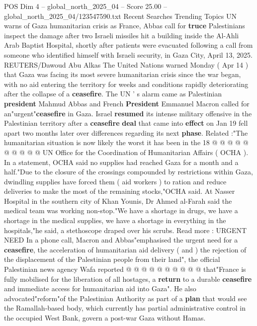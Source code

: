 \begin{textsample}{POS Dim 4 – global\_north\_2025\_04 – Score 25.00 – global\_north\_2025\_04/123547590.txt}  \label{ex:f4_pos_213}
Recent Searches Trending Topics UN warns of Gaza humanitarian crisis as France, Abbas call for \textbf{truce} Palestinians inspect the damage after two Israeli missiles hit a building inside the Al-Ahli Arab Baptist Hospital, shortly after patients were evacuated following a call from someone who identified himself with Israeli security, in Gaza City, April 13, 2025.
REUTERS/Dawoud Abu Alkas The United Nations warned Monday ( Apr 14 ) that Gaza was facing its most severe humanitarian crisis since the war began, with no aid entering the territory for weeks and conditions rapidly deteriorating after the collapse of a \textbf{ceasefire}.
The UN ' s alarm came as Palestinian \textbf{president} Mahmud Abbas and French \textbf{President} Emmanuel Macron called for an"urgent"\textbf{ceasefire} in Gaza.
Israel \textbf{resumed} its intense military offensive in the Palestinian territory after a \textbf{ceasefire} \textbf{deal} that came into \textbf{effect} on Jan 19 fell apart two months later over differences regarding its next \textbf{phase}.
Related :"The humanitarian situation is now likely the worst it has been in the 18 @ @ @ @ @ @ @ @ @ @ UN Office for the Coordination of Humanitarian Affairs ( OCHA ).
In a statement, OCHA said no supplies had reached Gaza for a month and a half."Due to the closure of the crossings compounded by restrictions within Gaza, dwindling supplies have forced them ( aid workers ) to ration and reduce deliveries to make the most of the remaining stocks,"OCHA said.
At Nasser Hospital in the southern city of Khan Younis, Dr Ahmed al-Farah said the medical team was working non-stop."We have a shortage in drugs, we have a shortage in the medical supplies, we have a shortage in everything in the hospitals,"he said, a stethoscope draped over his scrubs.
Read more : URGENT NEED In a phone call, Macron and Abbas"emphasised the urgent need for a \textbf{ceasefire}, the acceleration of humanitarian aid delivery ( and ) the rejection of the displacement of the Palestinian people from their land", the official Palestinian news agency Wafa reported @ @ @ @ @ @ @ @ @ @ that"France is fully mobilised for the liberation of all hostages, a \textbf{return} to a durable \textbf{ceasefire} and immediate access for humanitarian aid into Gaza".
He also advocated"reform"of the Palestinian Authority as part of a \textbf{plan} that would see the Ramallah-based body, which currently has partial administrative control in the occupied West Bank, govern a post-war Gaza without Hamas.

\end{textsample}
